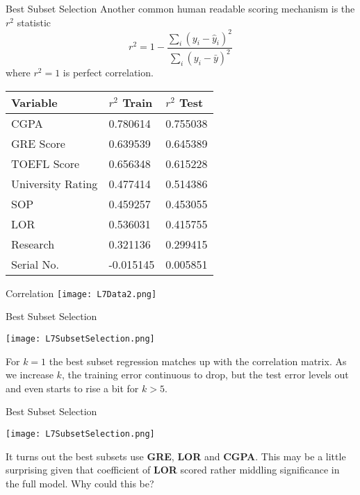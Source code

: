 \documentclass[10pt, table, dvipsnames,xcdraw, handout ]{beamer}
\begin{document}
\begin{frame}[fragile]{Best Subset Selection}
Another common human readable scoring mechanism is the $r^2$ statistic
$$
r^2 = 1 - \frac{\sum_i(y_i - \hat y_i)^2}{\sum_i (y_i - \bar y)^2}
$$
where $r^2 = 1$ is perfect correlation.
\begin{table}[]
\begin{tabular}{lll}
\hline
\textbf{Variable} & \textbf{$r^2$ Train} & \textbf{$r^2$ Test} \\ \hline
CGPA 	&0.780614 	&0.755038\\
GRE Score  	&0.639539 	&0.645389\\
TOEFL Score 	&0.656348 	&0.615228\\
University Rating 	&0.477414 	&0.514386\\
SOP	&0.459257 	&0.453055\\
LOR	&0.536031 	&0.415755\\
Research	&0.321136 	&0.299415\\
Serial No.	&-0.015145 	&0.005851
\end{tabular}
\end{table}
\end{frame}






\begin{frame}[fragile]{Correlation}
	\centering \texttt{[image: L7Data2.png]} 
\end{frame}



\begin{frame}[fragile]{Best Subset Selection}
  \begin{minipage}[t][0.6\textheight][t]{\textwidth}
	\centering \texttt{[image: L7SubsetSelection.png]} 
  \end{minipage}
  \vfill
\begin{minipage}[t][0.4\textheight][t]{\textwidth}
For $k=1$ the best subset regression matches up with the correlation matrix. As we increase $k$, the training error continuous to drop, but the test error levels out and even starts to rise a bit for $k>5$. 

\end{minipage}


\end{frame}




\begin{frame}[fragile]{Best Subset Selection}
  \begin{minipage}[t][0.6\textheight][t]{\textwidth}
	\centering \texttt{[image: L7SubsetSelection.png]} 
  \end{minipage}
  \vfill
\begin{minipage}[t][0.4\textheight][t]{\textwidth}
It turns out the best subsets use \textbf{GRE}, \textbf{LOR} and \textbf{CGPA}. This may be a little surprising given that coefficient of \textbf{LOR} scored rather middling significance in the full model. Why could this be?

\end{minipage}
\end{frame}
\end{document}
